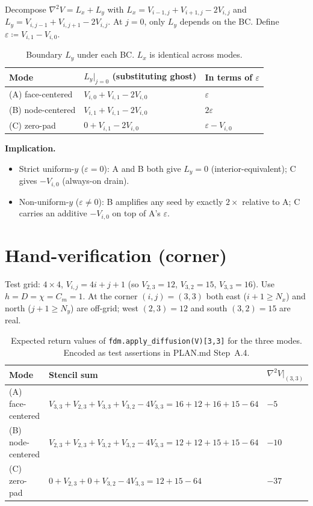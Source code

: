 \documentclass[11pt,letterpaper]{article}
\begin{document}
Decompose $\nabla^2 V = L_x + L_y$ with $L_x = V_{i-1,j}+V_{i+1,j}-2V_{i,j}$
and $L_y = V_{i,j-1}+V_{i,j+1}-2V_{i,j}$. At $j=0$, only $L_y$ depends on
the BC. Define $\varepsilon \coloneqq V_{i,1} - V_{i,0}$.
%
\begin{table}[h]\centering
\renewcommand{\arraystretch}{1.30}
\begin{tabular}{@{}lll@{}}
\toprule
\textbf{Mode} & $L_y \big|_{j=0}$ (substituting ghost) & In terms of $\varepsilon$ \\ \midrule
(A) face-centered  & $V_{i,0}+V_{i,1}-2V_{i,0}$  & $\varepsilon$ \\
(B) node-centered  & $V_{i,1}+V_{i,1}-2V_{i,0}$  & $2\varepsilon$ \\
(C) zero-pad       & $0    +V_{i,1}-2V_{i,0}$    & $\varepsilon - V_{i,0}$ \\
\bottomrule
\end{tabular}
\caption{Boundary $L_y$ under each BC. $L_x$ is identical across modes.}
\end{table}
%
\textbf{Implication.}
\begin{itemize}
\item Strict uniform-$y$ ($\varepsilon = 0$): A and B both give $L_y = 0$ (interior-equivalent); C gives $-V_{i,0}$ (always-on drain).
\item Non-uniform-$y$ ($\varepsilon \ne 0$): B amplifies any seed by exactly $2\times$ relative to A; C carries an additive $-V_{i,0}$ on top of A's $\varepsilon$.
\end{itemize}

\section{Hand-verification (corner)}

Test grid: $4 \times 4$, $V_{i,j} = 4i + j + 1$ (so $V_{2,3}=12$, $V_{3,2}=15$, $V_{3,3}=16$). Use $h=D=\chi=C_m=1$.
At the corner $(i,j)=(3,3)$ both east ($i+1 \ge N_x$) and north ($j+1 \ge N_y$) are off-grid; west $(2,3)=12$ and south $(3,2)=15$ are real.
%
\begin{table}[h]\centering
\renewcommand{\arraystretch}{1.30}
\begin{tabular}{@{}lll@{}}
\toprule
\textbf{Mode} & \textbf{Stencil sum} & $\nabla^2 V\big|_{(3,3)}$ \\ \midrule
(A) face-centered  & $V_{3,3} + V_{2,3} + V_{3,3} + V_{3,2} - 4V_{3,3} = 16+12+16+15-64$  & $-5$ \\
(B) node-centered  & $V_{2,3} + V_{2,3} + V_{3,2} + V_{3,2} - 4V_{3,3} = 12+12+15+15-64$  & $-10$ \\
(C) zero-pad       & $0       + V_{2,3} + 0       + V_{3,2} - 4V_{3,3} =     12+15-64$    & $-37$ \\
\bottomrule
\end{tabular}
\caption{Expected return values of \texttt{fdm.apply\_diffusion(V)[3,3]} for the three modes. Encoded as test assertions in PLAN.md Step~A.4.}
\end{table}
\end{document}
